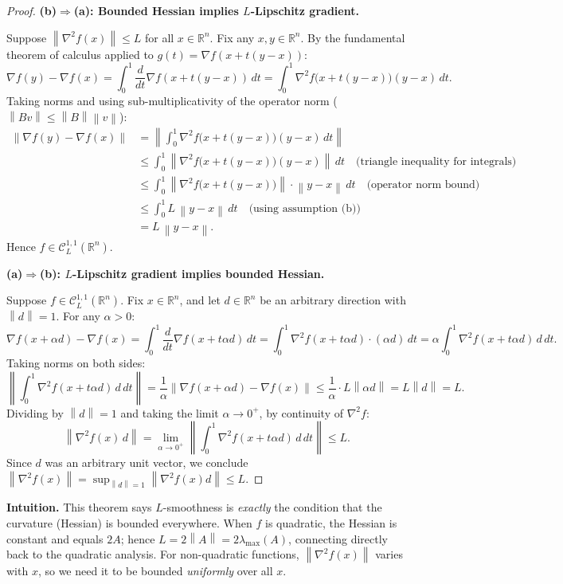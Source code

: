 \documentclass[11pt]{article}
\theoremstyle{definition}
\theoremstyle{plain}
\newcommand{\R}{\mathbb{R}}
\newcommand{\norm}[1]{\left\|#1\right\|}
\newcommand{\grad}{\nabla}
\begin{document}
\begin{proof}
\textbf{(b)$\Rightarrow$(a): Bounded Hessian implies $L$-Lipschitz gradient.}

Suppose $\norm{\grad^2 f(x)}\leq L$ for all $x\in\R^n$.
Fix any $x,y\in\R^n$. By the fundamental theorem of calculus applied
to $g(t)=\grad f(x+t(y-x))$:
\[
  \grad f(y) - \grad f(x)
  = \int_0^1 \frac{d}{dt}\grad f(x+t(y-x))\,dt
  = \int_0^1 \grad^2 f\bigl(x+t(y-x)\bigr)(y-x)\,dt.
\]
Taking norms and using sub-multiplicativity of the operator norm ($\norm{Bv}\leq\norm{B}\norm{v}$):
\begin{align*}
  \norm{\grad f(y)-\grad f(x)}
  &= \left\|\int_0^1 \grad^2 f\bigl(x+t(y-x)\bigr)(y-x)\,dt\right\|\\
  &\leq \int_0^1 \left\|\grad^2 f\bigl(x+t(y-x)\bigr)(y-x)\right\|\,dt
  \quad\text{(triangle inequality for integrals)}\\
  &\leq \int_0^1 \left\|\grad^2 f\bigl(x+t(y-x)\bigr)\right\|\cdot\norm{y-x}\,dt
  \quad\text{(operator norm bound)}\\
  &\leq \int_0^1 L\,\norm{y-x}\,dt
  \quad\text{(using assumption (b))}\\
  &= L\,\norm{y-x}.
\end{align*}
Hence $f\in\mathcal{C}^{1,1}_L(\R^n)$.

\medskip
\textbf{(a)$\Rightarrow$(b): $L$-Lipschitz gradient implies bounded Hessian.}

Suppose $f\in\mathcal{C}^{1,1}_L(\R^n)$. Fix $x\in\R^n$,
and let $d\in\R^n$ be an arbitrary direction with $\norm{d}=1$. For any $\alpha>0$:
\[
  \grad f(x+\alpha d)-\grad f(x)
  = \int_0^1 \frac{d}{dt}\grad f(x+t\alpha d)\,dt
  = \int_0^1 \grad^2 f(x+t\alpha d)\cdot(\alpha d)\,dt
  = \alpha\int_0^1 \grad^2 f(x+t\alpha d)\,d\,dt.
\]
Taking norms on both sides:
\[
  \left\|\int_0^1 \grad^2 f(x+t\alpha d)\,d\,dt\right\|
  = \frac{1}{\alpha}\norm{\grad f(x+\alpha d)-\grad f(x)}
  \leq \frac{1}{\alpha}\cdot L\norm{\alpha d}
  = L\norm{d} = L.
\]
Dividing by $\norm{d}=1$ and taking the limit $\alpha\to 0^+$,
by continuity of $\grad^2 f$:
\[
  \norm{\grad^2 f(x)\,d}
  = \lim_{\alpha\to 0^+}\left\|\int_0^1 \grad^2 f(x+t\alpha d)\,d\,dt\right\|
  \leq L.
\]
Since $d$ was an arbitrary unit vector, we conclude $\norm{\grad^2 f(x)} = \sup_{\norm{d}=1}\norm{\grad^2 f(x)d} \leq L$.
\end{proof}

\noindent\textbf{Intuition.} This theorem says $L$-smoothness is \emph{exactly}
the condition that the curvature (Hessian) is bounded everywhere.
When $f$ is quadratic, the Hessian is constant and equals $2A$;
hence $L=2\norm{A}=2\lambda_{\max}(A)$, connecting directly back to the quadratic analysis.
For non-quadratic functions, $\norm{\grad^2 f(x)}$ varies with $x$,
so we need it to be bounded \emph{uniformly} over all $x$.
\end{document}
